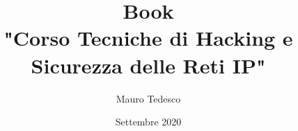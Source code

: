 \documentclass[a4paper,12pt]{book}
\begin{document}
	

\renewcommand{\chaptermark}[1]{ \markboth{#1}{} }
\renewcommand{\sectionmark}[1]{ \markright{#1}{} }

\renewcommand{\headrulewidth}{0.5pt}
\renewcommand{\footrulewidth}{1pt}




\author{Mauro Tedesco}
\title{Book \\
	"Corso Tecniche di Hacking e Sicurezza delle
	Reti IP"}
\date{Settembre 2020}

\frontmatter
\maketitle
\tableofcontents

\mainmatter



















\backmatter




\printindex
\end{document}
